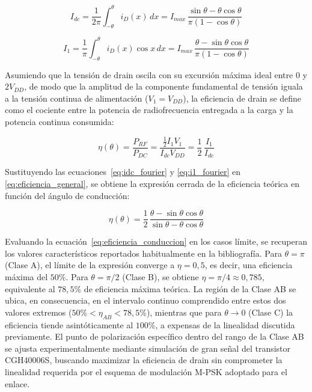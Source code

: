 \begin{equation}
    I_{dc} = \frac{1}{2\pi}\int_{-\theta}^{\theta} i_D(x)\,dx = I_{max}\,\frac{\sin\theta - \theta\cos\theta}{\pi(1-\cos\theta)}
    \label{eq:idc_fourier}
\end{equation}

\begin{equation}
    I_1 = \frac{1}{\pi}\int_{-\theta}^{\theta} i_D(x)\cos x\,dx = I_{max}\,\frac{\theta - \sin\theta\cos\theta}{\pi(1-\cos\theta)}
    \label{eq:i1_fourier}
\end{equation}

Asumiendo que la tensión de drain oscila con su excursión máxima ideal entre $0$ y $2V_{DD}$, de modo que la amplitud de la componente fundamental de tensión iguala a la tensión continua de alimentación ($V_1 = V_{DD}$), la eficiencia de drain se define como el cociente entre la potencia de radiofrecuencia entregada a la carga y la potencia continua consumida:

\begin{equation}
    \eta(\theta) = \frac{P_{RF}}{P_{DC}} = \frac{\tfrac{1}{2} I_1 V_1}{I_{dc} V_{DD}} = \frac{1}{2}\,\frac{I_1}{I_{dc}}
    \label{eq:eficiencia_general}
\end{equation}

Sustituyendo las ecuaciones~\eqref{eq:idc_fourier} y \eqref{eq:i1_fourier} en \eqref{eq:eficiencia_general}, se obtiene la expresión cerrada de la eficiencia teórica en función del ángulo de conducción:

\begin{equation}
    \boxed{\eta(\theta) = \frac{1}{2}\,\frac{\theta - \sin\theta\cos\theta}{\sin\theta - \theta\cos\theta}}
    \label{eq:eficiencia_conduccion}
\end{equation}

Evaluando la ecuación~\eqref{eq:eficiencia_conduccion} en los casos límite, se recuperan los valores característicos reportados habitualmente en la bibliografía. Para $\theta = \pi$ (Clase A), el límite de la expresión converge a $\eta = 0{,}5$, es decir, una eficiencia máxima del $50\%$. Para $\theta = \pi/2$ (Clase B), se obtiene $\eta = \pi/4 \approx 0{,}785$, equivalente al $78{,}5\%$ de eficiencia máxima teórica. La región de la Clase AB se ubica, en consecuencia, en el intervalo continuo comprendido entre estos dos valores extremos ($50\% < \eta_{AB} < 78{,}5\%$), mientras que para $\theta \to 0$ (Clase C) la eficiencia tiende asintóticamente al $100\%$, a expensas de la linealidad discutida previamente. El punto de polarización específico dentro del rango de la Clase AB se ajusta experimentalmente mediante simulación de gran señal del transistor CGH40006S, buscando maximizar la eficiencia de drain sin comprometer la linealidad requerida por el esquema de modulación M-PSK adoptado para el enlace.

